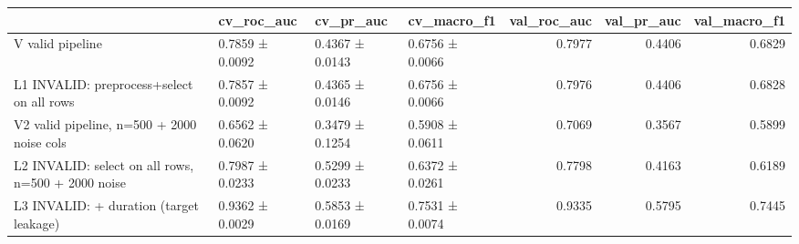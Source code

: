 \begin{tabular}{llllrrr}
\toprule
 & cv\_roc\_auc & cv\_pr\_auc & cv\_macro\_f1 & val\_roc\_auc & val\_pr\_auc & val\_macro\_f1 \\
\midrule
V   valid pipeline & 0.7859 ± 0.0092 & 0.4367 ± 0.0143 & 0.6756 ± 0.0066 & 0.7977 & 0.4406 & 0.6829 \\
L1  INVALID: preprocess+select on all rows & 0.7857 ± 0.0092 & 0.4365 ± 0.0146 & 0.6756 ± 0.0066 & 0.7976 & 0.4406 & 0.6828 \\
V2  valid pipeline, n=500 + 2000 noise cols & 0.6562 ± 0.0620 & 0.3479 ± 0.1254 & 0.5908 ± 0.0611 & 0.7069 & 0.3567 & 0.5899 \\
L2  INVALID: select on all rows, n=500 + 2000 noise & 0.7987 ± 0.0233 & 0.5299 ± 0.0233 & 0.6372 ± 0.0261 & 0.7798 & 0.4163 & 0.6189 \\
L3  INVALID: + duration (target leakage) & 0.9362 ± 0.0029 & 0.5853 ± 0.0169 & 0.7531 ± 0.0074 & 0.9335 & 0.5795 & 0.7445 \\
\bottomrule
\end{tabular}
